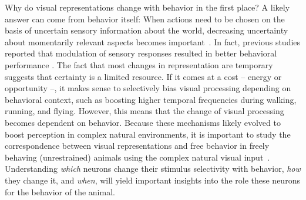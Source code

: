 \documentclass[B2,COG]{ercgrant}
\begin{document}
Why do visual representations change with behavior in the first place? 
A likely answer can come from behavior itself:
When actions need to be chosen on the basis of uncertain sensory information about the world, decreasing uncertainty about momentarily relevant aspects becomes important~\parencite{Chebolu2022-tb}. 
In fact, previous studies reported that modulation of sensory responses resulted in better behavioral performance \parencite{Spitzer1988-kq, Bennett2013-rk, Dadarlat2017-jw, De_Gee2022-ir}.
The fact that most changes in representation are temporary suggests that certainty is a limited resource.
If it comes at a cost -- energy or opportunity --, it makes sense to selectively bias visual processing depending on behavioral context, such as boosting higher temporal frequencies during walking, running, and flying.
However, this means that the change of visual processing becomes dependent on behavior.
Because these mechanisms likely evolved to boost perception in complex natural environments, it is important to study the correspondence between visual representations and free behavior in freely behaving (unrestrained) animals using the complex natural visual input~\parencite[\eg][]{Parker2022-ac, Huk2018-ez, Datta2019-qj}.
Understanding \textit{which} neurons change their stimulus selectivity with behavior, \textit{how} they change it, and \textit{when}, will yield important insights into the role these neurons for the behavior of the animal. 
\end{document}
